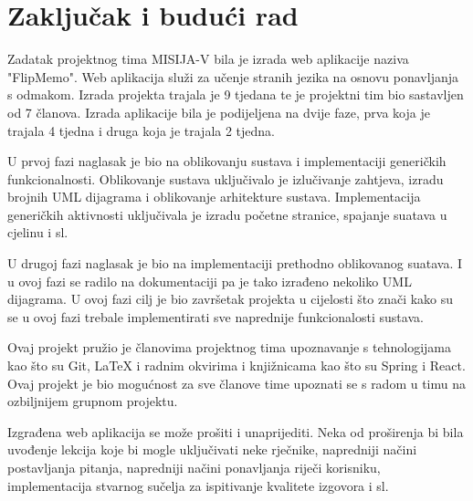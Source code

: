 \chapter{Zaključak i budući rad}
		
		
		
		 
		 Zadatak projektnog tima MISIJA-V bila je izrada web aplikacije naziva "FlipMemo". Web aplikacija služi za učenje stranih jezika na osnovu ponavljanja s odmakom. Izrada projekta trajala je 9 tjedana te je projektni tim bio sastavljen od 7 članova. Izrada aplikacije bila je podijeljena na dvije faze, prva koja je trajala 4 tjedna i druga koja je trajala 2 tjedna.
		 
		 U prvoj fazi naglasak je bio na oblikovanju sustava i implementaciji generičkih funkcionalnosti. Oblikovanje sustava uključivalo je izlučivanje zahtjeva, izradu brojnih UML dijagrama i oblikovanje arhitekture sustava. Implementacija generičkih aktivnosti uključivala je izradu početne stranice, spajanje suatava u cjelinu i sl.
		 
		 U drugoj fazi naglasak je bio na implementaciji prethodno oblikovanog suatava. I u ovoj fazi se radilo na dokumentaciji pa je tako izrađeno nekoliko UML dijagrama. U ovoj fazi cilj je bio završetak projekta u cijelosti što znači kako su se u ovoj fazi trebale implementirati sve naprednije funkcionalosti sustava.
		 
		 Ovaj projekt pružio je članovima projektnog tima upoznavanje s tehnologijama kao što su Git, LaTeX i radnim okvirima i knjižnicama kao što su Spring i React. Ovaj projekt je bio mogućnost za sve članove time upoznati se s radom u timu na ozbiljnijem grupnom projektu.
		 
		 Izgrađena web aplikacija se može prošiti i unaprijediti. Neka od proširenja bi bila uvođenje lekcija koje bi mogle uključivati neke rječnike, napredniji načini postavljanja pitanja, napredniji načini ponavljanja riječi korisniku, implementacija stvarnog sučelja za ispitivanje kvalitete izgovora i sl.
		
		\eject 